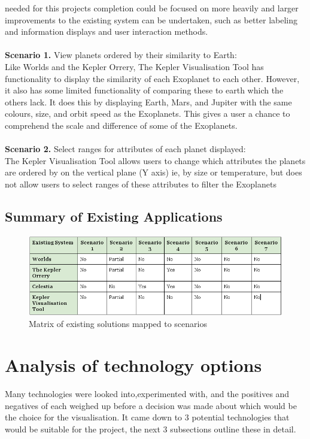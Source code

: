 needed for this projects completion could be focused on more heavily and larger
improvements to the existing system can be undertaken, such as better labeling
and information displays and user interaction methods.
\\\\
{\bf Scenario 1.} View planets ordered by their similarity to Earth:\\
Like Worlds and the Kepler Orrery, The Kepler Visualisation Tool has
functionality to display the similarity of each Exoplanet to each other.
However, it also has some limited functionality of comparing these to earth
which the others lack. It does this by displaying Earth, Mars, and Jupiter with
the same colours, size, and orbit speed as the Exoplanets. This gives a user a
chance to comprehend the scale and difference of some of the Exoplanets.
\\\\
{\bf Scenario 2.} Select ranges for attributes of each planet displayed:\\
The Kepler Visualisation Tool allows users to change which attributes the
planets are ordered by on the vertical plane (Y axis) ie, by size or
temperature, but does not allow users to select ranges of these attributes to
filter the Exoplanets

\subsection{Summary of Existing Applications}
\begin{figure}[H]
  \centering
      \includegraphics[width=1\textwidth]{images/existing.png}
  \caption{Matrix of existing solutions mapped to scenarios}  
    \label{fig:existing}
\end{figure}


\section{Analysis of technology options}
Many technologies were looked into,experimented with, and the positives and
negatives of each weighed up before a decision was made about which would be the
choice for the visualisation. It came down to 3 potential technologies that
would be suitable for the project, the next 3 subsections outline these in
detail.


